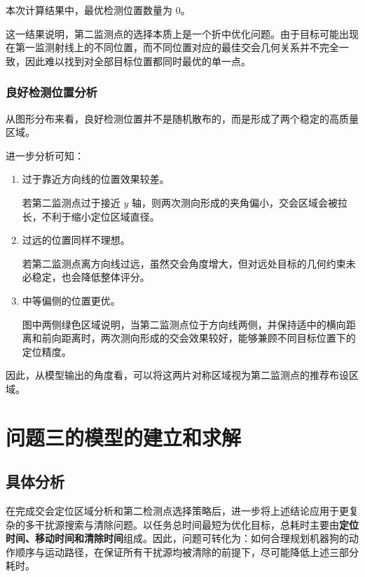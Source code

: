 \documentclass[withoutpreface,bwprint]{cumcmthesis}
\begin{document}
本次计算结果中，最优检测位置数量为 0。

这一结果说明，第二监测点的选择本质上是一个折中优化问题。由于目标可能出现在第一监测射线上的不同位置，而不同位置对应的最佳交会几何关系并不完全一致，因此难以找到对全部目标位置都同时最优的单一点。

\subsubsection{良好检测位置分析}

从图形分布来看，良好检测位置并不是随机散布的，而是形成了两个稳定的高质量区域。

进一步分析可知：

\begin{enumerate}
    \item 过于靠近方向线的位置效果较差。

    若第二监测点过于接近 $y$ 轴，则两次测向形成的夹角偏小，交会区域会被拉长，不利于缩小定位区域直径。

    \item 过远的位置同样不理想。

    若第二监测点离方向线过远，虽然交会角度增大，但对远处目标的几何约束未必稳定，也会降低整体评分。

    \item 中等偏侧的位置更优。

    图中两侧绿色区域说明，当第二监测点位于方向线两侧，并保持适中的横向距离和前向距离时，两次测向形成的交会效果较好，能够兼顾不同目标位置下的定位精度。
\end{enumerate}

因此，从模型输出的角度看，可以将这两片对称区域视为第二监测点的推荐布设区域。


























\newpage
\section{问题三的模型的建立和求解}
\subsection{具体分析}
在完成交会定位区域分析和第二检测点选择策略后，进一步将上述结论应用于更复杂的多干扰源搜索与清除问题。以任务总时间最短为优化目标，总耗时主要由\textbf{定位时间、移动时间和清除时间}组成。因此，问题可转化为：如何合理规划机器狗的动作顺序与运动路径，在保证所有干扰源均被清除的前提下，尽可能降低上述三部分耗时。
\end{document}
